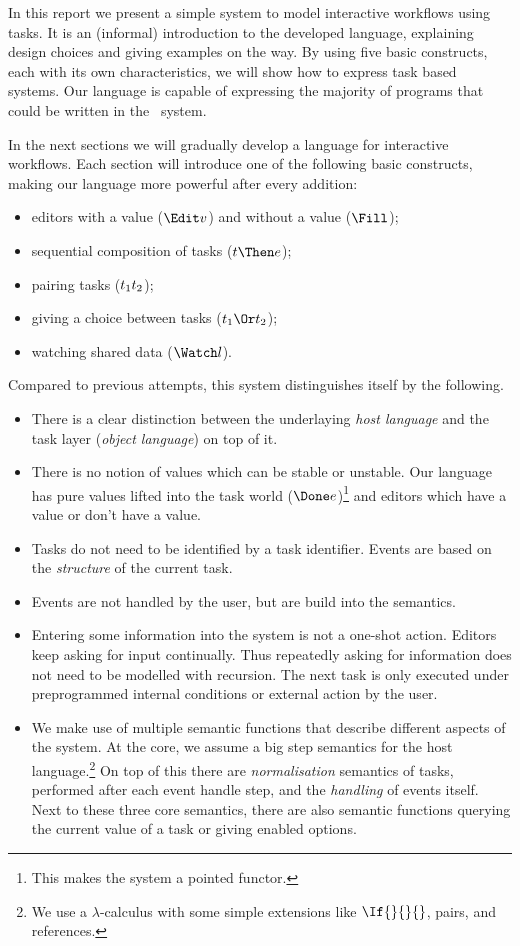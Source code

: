 
In this report we present a simple system to model interactive workflows using tasks.
It is an (informal) introduction to the developed language,
explaining design choices and giving examples on the way.
By using five basic constructs,
each with its own characteristics,
we will show how to express task based systems.
Our language is capable of expressing the majority of programs that could be written in the \ITASKS\ system.

In the next sections we will gradually develop a language for interactive workflows.
Each section will introduce one of the following basic constructs,
making our language more powerful after every addition:
\begin{itemize}
  \item editors with a value ($\Edit v$) and without a value ($\Fill$);
  \item sequential composition of tasks ($t \Then e$);
  \item pairing tasks ($t_1 \relax t_2$);
  \item giving a choice between tasks ($t_1 \Or t_2$);
  \item watching shared data ($\Watch l$).
\end{itemize}

Compared to previous attempts,
this system distinguishes itself by the following.
\begin{itemize}
  \item
    There is a clear distinction between the underlaying \emph{host language} and the task layer (\emph{object language}) on top of it.
  \item
    There is no notion of values which can be stable or unstable.
    Our language has pure values lifted into the task world ($\Done e$)\footnote{
      This makes the system a pointed functor.}
    and editors which have a value or don't have a value.
  \item
    Tasks do not need to be identified by a task identifier.
    Events are based on the \emph{structure} of the current task.
  \item
    Events are not handled by the user, but are build into the semantics.
  \item
    Entering some information into the system is not a one-shot action.
    Editors keep asking for input continually.
    Thus repeatedly asking for information does not need to be modelled with recursion.
    The next task is only executed under preprogrammed internal conditions or external action by the user.
  \item
    We make use of multiple semantic functions that describe different aspects of the system.
    At the core, we assume a big step semantics for the host language.\footnote{
      We use a $\lambda$-calculus with some simple extensions like $\If{}{}{}$, pairs, and references.}
    On top of this there are \emph{normalisation} semantics of tasks,
    performed after each event handle step,
    and the \emph{handling} of events itself.
    Next to these three core semantics,
    there are also semantic functions querying the current value of a task
    or giving enabled options.
\end{itemize}

